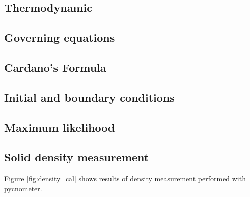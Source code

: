 \documentclass[a4paper,fleqn]{cas-dc}
\begin{document}
\subsection{Thermodynamic}


\subsection{Governing equations}


\subsection{Cardano's Formula} \label{CH: Cardano}


\subsection{Initial and boundary conditions} \label{CH: IC_BC}


\subsection{Maximum likelihood} \label{CH: ML}


\subsection{Solid density measurement} \label{CH: Solid_Density_Measurment}

Figure \ref{fig:density_cal} shows results of density measurement performed with pycnometer.
\end{document}
